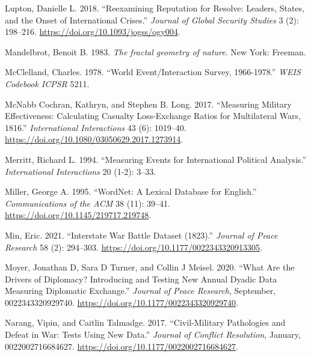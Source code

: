 \documentclass{article}
\newlength{\cslhangindent}
\newlength{\cslentryspacingunit} %
\newenvironment{CSLReferences}[2] %
 {%
  \setlength{\parindent}{0pt}
  \ifodd #1
  \let\oldpar\par
  \def\par{\hangindent=\cslhangindent\oldpar}
  \fi
  \setlength{\parskip}{#2\cslentryspacingunit}
 }%
 {}
\begin{document}
\begin{CSLReferences}{1}{0}
\leavevmode{}%
Lupton, Danielle L. 2018. {``Reexamining {Reputation} for {Resolve}:
{Leaders}, {States}, and the {Onset} of {International Crises}.''}
\emph{Journal of Global Security Studies} 3 (2): 198--216.
\url{https://doi.org/10.1093/jogss/ogy004}.

\leavevmode{}%
Mandelbrot, Benoit B. 1983. \emph{{The fractal geometry of nature}}.
{New York}: {Freeman}.

\leavevmode{}%
McClelland, Charles. 1978. {``World Event/Interaction Survey,
1966-1978.''} \emph{WEIS Codebook ICPSR} 5211.

\leavevmode{}%
McNabb Cochran, Kathryn, and Stephen B. Long. 2017. {``Measuring
{Military Effectiveness}: {Calculating Casualty Loss-Exchange Ratios}
for {Multilateral Wars}, 1816.''} \emph{International
Interactions} 43 (6): 1019--40.
\url{https://doi.org/10.1080/03050629.2017.1273914}.

\leavevmode{}%
Merritt, Richard L. 1994. {``Measuring Events for International
Political Analysis.''} \emph{International Interactions} 20 (1-2):
3--33.

\leavevmode{}%
Miller, George A. 1995. {``{WordNet}: A Lexical Database for
{English}.''} \emph{Communications of the ACM} 38 (11): 39--41.
\url{https://doi.org/10.1145/219717.219748}.

\leavevmode{}%
Min, Eric. 2021. {``Interstate {War Battle} Dataset
(1823).''} \emph{Journal of Peace Research} 58 (2):
294--303. \url{https://doi.org/10.1177/0022343320913305}.

\leavevmode{}%
Moyer, Jonathan D, Sara D Turner, and Collin J Meisel. 2020. {``What Are
the Drivers of Diplomacy? {Introducing} and Testing New Annual Dyadic
Data Measuring Diplomatic Exchange.''} \emph{Journal of Peace Research},
September, 0022343320929740.
\url{https://doi.org/10.1177/0022343320929740}.

\leavevmode{}%
Narang, Vipin, and Caitlin Talmadge. 2017. {``Civil-Military
{Pathologies} and {Defeat} in {War}: {Tests Using New Data}.''}
\emph{Journal of Conflict Resolution}, January, 0022002716684627.
\url{https://doi.org/10.1177/0022002716684627}.


\end{CSLReferences}
\end{document}
